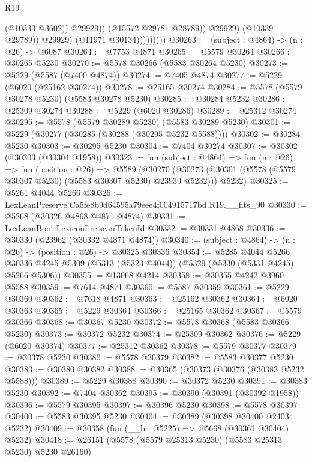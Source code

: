 \begin{lexlean}{R19}
\begin{coremodule}
                                  (@10333 @3602))
                                @29929))
                            (@15572 @29781 @28789))
                          @29929)
                        (@10339 @29789))
                      @29929)
                    (@11971 @30134)))))))))
@30263 := (subject : @4864) -> (n : @26) -> @6087
@30264 := @7753 @4871
@30265 := @5579 @30264
@30266 := @30265 @5230
@30270 := @5578 @30266 (@5583 @30264 @5230)
@30273 := @5229 (@5587 (@7400 @4874))
@30274 := @7405 @4874
@30277 := @5229 (@6020 (@25162 @30274))
@30278 := @25165 @30274
@30284 := @5578 (@5579 @30278 @5230) (@5583 @30278 @5230)
@30285 := @30284 @5232
@30286 := @25309 @30274
@30288 := @5229 (@6020 @30286)
@30289 := @25312 @30274
@30295 := @5578 (@5579 @30289 @5230) (@5583 @30289 @5230)
@30301 := @5229 (@30277 (@30285 (@30288 (@30295 @5232 @5588))))
@30302 := @30284 @5230
@30303 := @30295 @5230
@30304 := @7404 @30274
@30307 := @30302 (@30303 (@30304 @1958))
@30323 := fun (subject : @4864) =>
  fun (n : @26) =>
  fun (position : @26) =>
  @5589
    (@30270 (@30273 (@30301 (@5578 (@5579 @30307 @5230) (@5583 @30307 @5230) @23939 @5232))) @5232)
@30325 := @5261 @4044 @5266
@30326 := LexLeanPreserve.Ca5fe8b9d64595a79eee4f004915717bd.R19.__fits_90
@30330 := @5268 (@30326 @4868 @4871 @4874)
@30331 := LexLeanBoot.LexiconLre.scanTokenId
@30332 := @30331 @4868
@30336 := @30330 (@23962 (@30332 @4871 @4874))
@30340 := (subject : @4864) -> (n : @26) -> (position : @26) -> @30325 @30336
@30354 := @5285
    @4044
    @5266
    @30336
    @4245
    @5309
    (@5313 (@5323 @4044))
    (@5329 (@5330 (@5331 @4245) @5266 @5306))
@30355 := @13068 @4214
@30358 := @30355 @4242 @3960 @5588
@30359 := @7614 @4871
@30360 := @5587 @30359
@30361 := @5229 @30360
@30362 := @7618 @4871
@30363 := @25162 @30362
@30364 := @6020 @30363
@30365 := @5229 @30364
@30366 := @25165 @30362
@30367 := @5579 @30366
@30368 := @30367 @5230
@30372 := @5578 @30368 (@5583 @30366 @5230)
@30373 := @30372 @5232
@30374 := @25309 @30362
@30376 := @5229 (@6020 @30374)
@30377 := @25312 @30362
@30378 := @5579 @30377
@30379 := @30378 @5230
@30380 := @5578 @30379
@30382 := @5583 @30377 @5230
@30383 := @30380 @30382
@30388 := @30365 (@30373 (@30376 (@30383 @5232 @5588)))
@30389 := @5229 @30388
@30390 := @30372 @5230
@30391 := @30383 @5230
@30392 := @7404 @30362
@30395 := @30390 (@30391 (@30392 @1958))
@30396 := @5579 @30395
@30397 := @30396 @5230
@30398 := @5578 @30397
@30400 := @5583 @30395 @5230
@30404 := @30389 (@30398 @30400 @24034 @5232)
@30409 := @30358 (fun (__b : @5225) => @5668 (@30361 @30404) @5232)
@30418 := @26151 (@5578 (@5579 @25313 @5230) (@5583 @25313 @5230) @5230 @26160)

\end{coremodule}
\end{lexlean}
